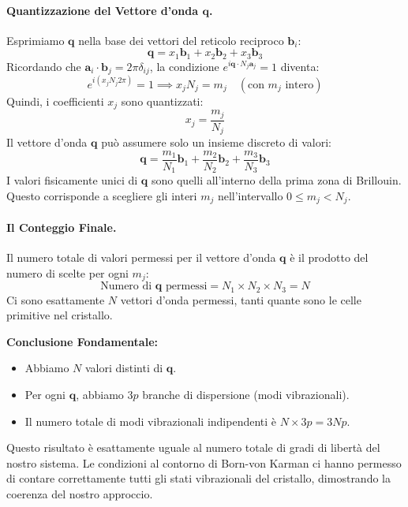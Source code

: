 \paragraph{Quantizzazione del Vettore d'onda \(\mathbf{q}\).}
Esprimiamo \(\mathbf{q}\) nella base dei vettori del reticolo reciproco \(\mathbf{b}_i\):
\[ \mathbf{q} = x_1 \mathbf{b}_1 + x_2 \mathbf{b}_2 + x_3 \mathbf{b}_3 \]
Ricordando che \(\mathbf{a}_i \cdot \mathbf{b}_j = 2\pi\delta_{ij}\), la condizione \(e^{i\mathbf{q}\cdot N_j\mathbf{a}_j} = 1\) diventa:
\[ e^{i(x_j N_j 2\pi)} = 1 \implies x_j N_j = m_j \quad (\text{con } m_j \text{ intero}) \]
Quindi, i coefficienti \(x_j\) sono quantizzati:
\[ x_j = \frac{m_j}{N_j} \]
Il vettore d'onda \(\mathbf{q}\) può assumere solo un insieme discreto di valori:
\[ \mathbf{q} = \frac{m_1}{N_1}\mathbf{b}_1 + \frac{m_2}{N_2}\mathbf{b}_2 + \frac{m_3}{N_3}\mathbf{b}_3 \]
I valori fisicamente unici di \(\mathbf{q}\) sono quelli all'interno della prima zona di Brillouin. Questo corrisponde a scegliere gli interi \(m_j\) nell'intervallo \(0 \le m_j < N_j\).

\paragraph{Il Conteggio Finale.}
Il numero totale di valori permessi per il vettore d'onda \(\mathbf{q}\) è il prodotto del numero di scelte per ogni \(m_j\):
\[ \text{Numero di } \mathbf{q} \text{ permessi} = N_1 \times N_2 \times N_3 = N \]
Ci sono esattamente \(N\) vettori d'onda permessi, tanti quante sono le celle primitive nel cristallo.

\textbf{Conclusione Fondamentale:}
\begin{itemize}
    \item Abbiamo \(N\) valori distinti di \(\mathbf{q}\).
    \item Per ogni \(\mathbf{q}\), abbiamo \(3p\) branche di dispersione (modi vibrazionali).
    \item Il numero totale di modi vibrazionali indipendenti è \(N \times 3p = 3Np\).
\end{itemize}
Questo risultato è esattamente uguale al numero totale di gradi di libertà del nostro sistema. Le condizioni al contorno di Born-von Karman ci hanno permesso di contare correttamente tutti gli stati vibrazionali del cristallo, dimostrando la coerenza del nostro approccio.

